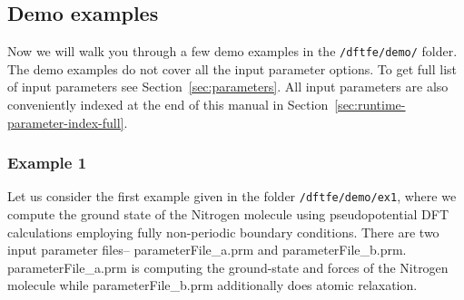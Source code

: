 \subsection{Demo examples}
Now we will walk you through a few demo examples in the \verb|/dftfe/demo/| folder. The demo examples do not cover all the input parameter options. To get full list of input parameters see Section~\ref{sec:parameters}. All input parameters are also conveniently indexed at the end of this manual in Section~\ref{sec:runtime-parameter-index-full}. 
\subsubsection{Example 1}\label{sec:example1}
Let us consider the first example given in the folder
\verb|/dftfe/demo/ex1|, where we compute the ground state of the Nitrogen molecule using pseudopotential DFT calculations employing fully non-periodic boundary conditions.
There are two input parameter files-- parameterFile\_a.prm and parameterFile\_b.prm. parameterFile\_a.prm is
computing the ground-state and forces of the Nitrogen molecule while parameterFile\_b.prm additionally does atomic relaxation.

